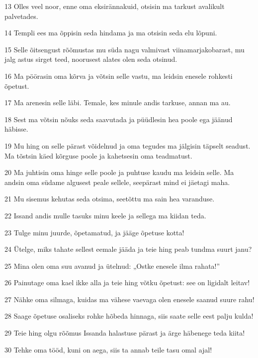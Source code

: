 \par 13 Olles veel noor, enne oma eksirännakuid, otsisin ma tarkust avalikult palvetades.
\par 14 Templi ees ma õppisin seda hindama ja ma otsisin seda elu lõpuni.
\par 15 Selle õitsengust rõõmustas mu süda nagu valmivast viinamarjakobarast, mu jalg astus sirget teed, noorusest alates olen seda otsinud.
\par 16 Ma pöörasin oma kõrva ja võtsin selle vastu, ma leidsin enesele rohkesti õpetust.
\par 17 Ma arenesin selle läbi. Temale, kes minule andis tarkuse, annan ma au.
\par 18 Sest ma võtsin nõuks seda saavutada ja püüdlesin hea poole ega jäänud häbisse.
\par 19 Mu hing on selle pärast võidelnud ja oma tegudes ma jälgisin täpselt seadust. Ma tõstsin käed kõrguse poole ja kahetsesin oma teadmatust.
\par 20 Ma juhtisin oma hinge selle poole ja puhtuse kaudu ma leidsin selle. Ma andsin oma südame algusest peale sellele, seepärast mind ei jäetagi maha.
\par 21 Mu sisemus kehutas seda otsima, seetõttu ma sain hea varanduse.
\par 22 Issand andis mulle tasuks minu keele ja sellega ma kiidan teda.
\par 23 Tulge minu juurde, õpetamatud, ja jääge õpetuse kotta!
\par 24 Ütelge, miks tahate sellest eemale jääda ja teie hing peab tundma suurt janu?
\par 25 Mina olen oma suu avanud ja ütelnud: „Ostke enesele ilma rahata!”
\par 26 Painutage oma kael ikke alla ja teie hing võtku õpetust: see on ligidalt leitav!
\par 27 Nähke oma silmaga, kuidas ma vähese vaevaga olen enesele saanud suure rahu!
\par 28 Saage õpetuse osaliseks rohke hõbeda hinnaga, siis saate selle eest palju kulda!
\par 29 Teie hing olgu rõõmus Issanda halastuse pärast ja ärge häbenege teda kiita!
\par 30 Tehke oma tööd, kuni on aega, siis ta annab teile tasu omal ajal!


